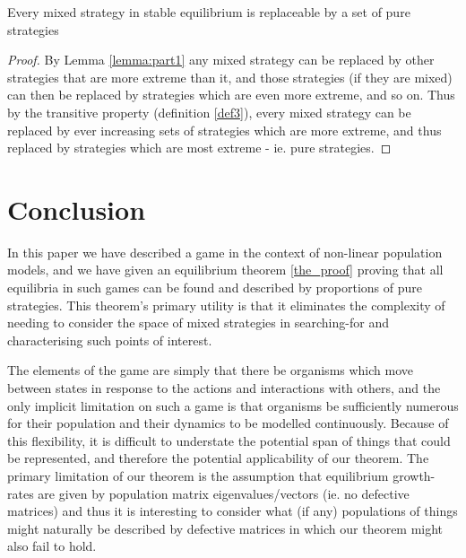 \begin{theorem}\label{the_proof}
Every mixed strategy in stable equilibrium is replaceable by a set of pure strategies 
\end{theorem}
\begin{proof}
By Lemma \ref{lemma:part1} any mixed strategy can be replaced by other strategies that are more extreme than it, and those strategies (if they are mixed) can then be replaced by strategies which are even more extreme, and so on.
Thus by the transitive property (definition \ref{def3}), every mixed strategy can be replaced by ever increasing sets of strategies which are more extreme, and thus replaced by strategies which are most extreme - ie. pure strategies.
\end{proof}

\section{Conclusion}\label{sec:conclusion}

In this paper we have described a game in the context of non-linear population models, and we have given an equilibrium theorem \ref{the_proof} proving that all equilibria in such games can be found and described by proportions of pure strategies. This theorem's primary utility is that it eliminates the complexity of needing to consider the space of mixed strategies in searching-for and characterising such points of interest.

The elements of the game are simply that there be organisms which move between states in response to the actions and interactions with others,
and the only implicit limitation on such a game is that organisms be sufficiently numerous for their population and their dynamics to be modelled continuously.
Because of this flexibility, it is difficult to understate the potential span of things that could be represented, and therefore the potential applicability of our theorem.
The primary limitation of our theorem is the assumption that equilibrium growth-rates are given by population matrix eigenvalues/vectors (ie. no defective matrices) and thus it is interesting to consider what (if any) populations of things might naturally be described by defective matrices in which our theorem might also fail to hold.



